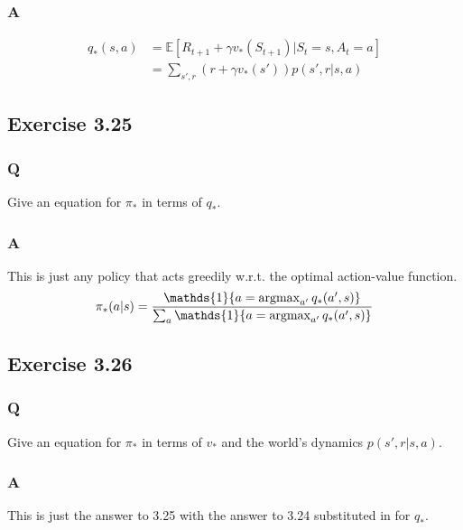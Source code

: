 \subsubsection*{A}
\begin{align}
    q_* (s, a) &= \mathbb{E} [ R_{t+1} + \gamma v_*(S_{t+1}) | S_t = s, A_t = a] \\
    &= \sum_{s', r} (r + \gamma v_*(s'))p(s', r | s, a)
\end{align} 


\subsection{Exercise 3.25}
\subsubsection*{Q}
Give an equation for $\pi_*$ in terms of $q_*$.

\subsubsection*{A}
This is just any policy that acts greedily w.r.t. the optimal action-value function.
\begin{equation}
    \pi_* (a|s) = \frac{\mathds{1}\{a = \argmax_{a'} q_*(a', s)\}}{\sum_{a} \mathds{1}\{a = \argmax_{a'}q_*(a', s)\}}
\end{equation} 

\subsection{Exercise 3.26}
\subsubsection*{Q}
Give an equation for $\pi_*$ in terms of $v_*$ and the world's dynamics $p(s', r| s, a)$.

\subsubsection*{A}
This is just the answer to 3.25 with the answer to 3.24 substituted in for $q_*$.


